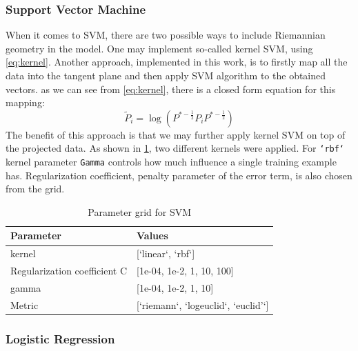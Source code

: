 \documentclass[12pt]{extarticle}
\theoremstyle{definition}
\theoremstyle{remark}
\begin{document}
	\subsubsection*{Support Vector Machine}
	
	When it comes to SVM, there are two possible ways to include Riemannian geometry in the model. One may implement so-called kernel SVM, using \cref{eq:kernel}. Another approach, implemented in this work, is to firstly map all the data into the tangent plane and then apply SVM algorithm to the obtained vectors. as we can see from \cref{eq:kernel}, there is a closed form equation for this mapping:
	\begin{equation*}
	\tilde{P}_i = \log (P^{*-\frac12}P_i P^{*-\frac12})
	\end{equation*}
	The benefit of this approach is that we may further apply kernel SVM on top of the projected data.  As shown in \cref{T:SVM_par}, two different kernels were applied. For \texttt{`rbf`} kernel parameter \texttt{Gamma} controls how much influence a single training example has. Regularization coefficient, penalty parameter of the error term, is also chosen from the grid. 
	\begin{table}[!h]
		\begin{center}
			\begin{tabular}{ l | l  }
				Parameter &  Values\\ \hline
				kernel & [`linear`, `rbf`] \\
				Regularization coefficient C &  [1e-04, 1e-2, 1, 10, 100]\\ 
				gamma & [1e-04, 1e-2, 1, 10] \\ 
				Metric &   [`riemann`, `logeuclid`, `euclid'`]\\ 
				
			\end{tabular}
			\caption{Parameter grid for SVM}
			\label{T:SVM_par}
		\end{center}
	\end{table}
	
	\subsubsection*{Logistic Regression}
	
\end{document}
